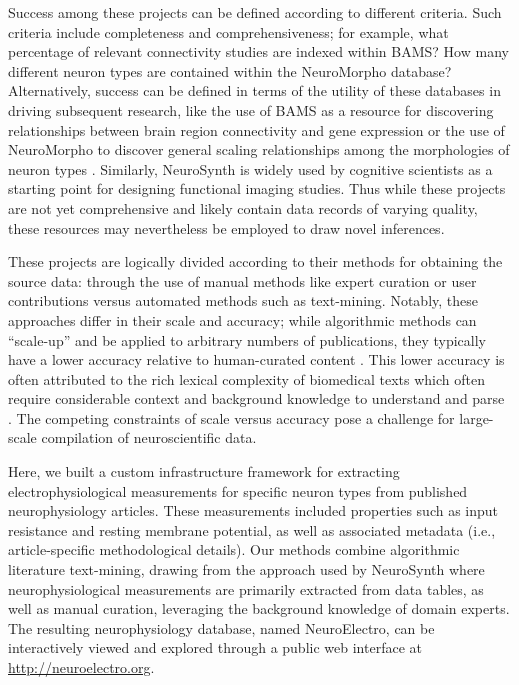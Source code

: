 \documentclass{template/frontiersSCNS} %
\begin{document}
Success among these projects can be defined according to different criteria.  
Such criteria include completeness and comprehensiveness; 
for example, what percentage of relevant connectivity studies are indexed within BAMS? 
How many different neuron types are contained within the NeuroMorpho database?  
Alternatively, success can be defined in terms of the utility of these databases in driving subsequent research, like the use of BAMS as a resource for discovering relationships between brain region connectivity and gene expression \citep{french_relationships_2011} or the use of NeuroMorpho to discover general scaling relationships among the morphologies of neuron types \citep{teeter_general_2011}. 
Similarly, NeuroSynth is widely used by cognitive scientists as a starting point for designing functional imaging studies.  
Thus while these projects are not yet comprehensive and likely contain data records of varying quality, these resources may nevertheless be employed to draw novel inferences.

These projects are logically divided according to their methods for obtaining the source data: through the use of manual methods like expert curation or user contributions versus automated methods such as text-mining.  
Notably, these approaches differ in their scale and accuracy; while algorithmic methods can ``scale-up'' and be applied to arbitrary numbers of publications, they typically have a lower accuracy relative to human-curated content \citep{french_automated_2009}.  
This lower accuracy is often attributed to the rich lexical complexity of biomedical texts which often require considerable context and background knowledge to understand and parse \citep{dickman_tough_2003,ambert_text-mining_2012}.  
The competing constraints of scale versus accuracy pose a challenge for large-scale compilation of neuroscientific data.

Here, we built a custom infrastructure framework for extracting electrophysiological measurements for specific neuron types from published neurophysiology articles.  
These measurements included properties such as input resistance and resting membrane potential, as well as associated metadata (i.e., article-specific methodological details).  Our methods combine algorithmic literature text-mining, drawing from the approach used by NeuroSynth \citep{yarkoni_large-scale_2011} where neurophysiological measurements are primarily extracted from data tables, as well as manual curation, leveraging the background knowledge of domain experts.  
The resulting neurophysiology database, named NeuroElectro, can be interactively viewed and explored through a public web interface at \url{http://neuroelectro.org}.
\end{document}
